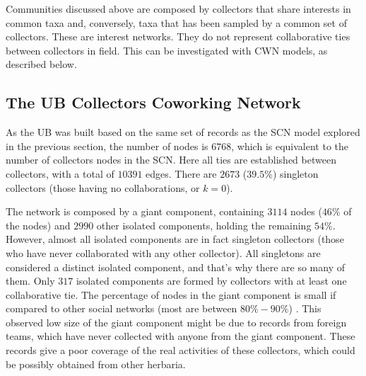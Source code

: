 


Communities discussed above are composed by collectors that share interests in common taxa and, conversely, taxa that has been sampled by a common set of collectors.
These are interest networks.
They do not represent collaborative ties between collectors in field.
This can be investigated with CWN models, as described below.


\subsection{The UB Collectors Coworking Network}

As the UB was built based on the same set of records as the SCN model explored in the previous section, the number of nodes is $6768$, which is equivalent to the number of collectors nodes in the SCN.
Here all ties are established between collectors, with a total of $10391$ edges.
There are $2673$ ($39.5\%$) singleton collectors (those having no collaborations, or $k=0$).

The network is composed by a giant component, containing $3114$ nodes ($46\%$ of the nodes) and $2990$ other isolated components, holding the remaining $54\%$.
However, almost all isolated components are in fact singleton collectors (those who have never collaborated with any other collector). All singletons are considered a distinct isolated component, and that's why there are so many of them. Only $317$ isolated components are formed by collectors with at least one collaborative tie.
The percentage of nodes in the giant component is small if compared to other social networks (most are between $80\% - 90\%$) \cite{Newman}. This observed low size of the giant component might be due to records from foreign teams, which have never collected with anyone from the giant component. These records give a poor coverage of the real activities of these collectors, which could be possibly obtained from other herbaria.

